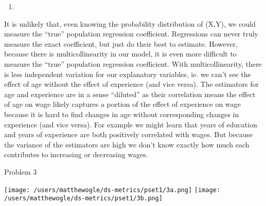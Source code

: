 \documentclass[
  12pt,
  landscape]{article}
\begin{document}
\begin{enumerate}
\def\labelenumi{\roman{enumi})}
\setcounter{enumi}{3}
\item
\end{enumerate}

It is unlikely that, even knowing the probability distribution of (X,Y),
we could measure the ``true'' population regression coefficient.
Regressions can never truly measure the exact coefficient, but just do
their best to estimate. However, because there is multicollinearity in
our model, it is even more difficult to measure the ``true'' population
regression coefficient. With multicollinearity, there is less
independent variation for our explanatory variables, ie. we can't see
the effect of age without the effect of experience (and vice versa). The
estimators for age and experience are in a sense ``diluted'' as their
correlation means the effect of age on wage likely captures a portion of
the effect of experience on wage because it is hard to find changes in
age without corresponding changes in experience (and vice versa). For
example we might learn that years of education and years of experience
are both positively correlated with wages. But because the variance of
the estimators are high we don't know exactly how much each contributes
to increasing or decreasing wages.

Problem 3

\texttt{[image: /users/matthewogle/ds-metrics/pset1/3a.png]}
\texttt{[image: /users/matthewogle/ds-metrics/pset1/3b.png]}
\end{document}
